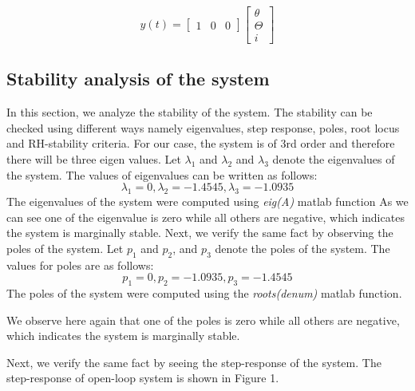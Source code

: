 \documentclass{article}
\begin{document}
\begin{equation}
y(t)=\begin{bmatrix}
1 & 0 & 0
\end{bmatrix}
\begin{bmatrix} \theta \\  \Theta \\ i \end{bmatrix}
\end{equation}



\subsection{Stability analysis of the system}
In this section, we analyze the stability of the system. The stability can be checked using different ways namely eigenvalues, step response, poles, root locus and RH-stability criteria. For our case, the system is of 3rd order and therefore there will be three eigen values. Let $\lambda_1$ and $\lambda_2$ and $\lambda_3$ denote the eigenvalues of the system. The values of eigenvalues can be written as follows:
\begin{equation} \lambda_1 = 0,   \lambda_2 = -1.4545,  \lambda_3 = -1.0935 \end{equation}
\vskip10pt
\noindent The eigenvalues of the system were computed using \textit{eig(A)} matlab function
\vskip10pt
\noindent As we can see one of the eigenvalue is zero while all others are negative, which indicates the system is marginally stable. Next, we verify the same fact by observing the poles of the system. Let $p_1$ and $p_2$, and $p_3$ denote the poles of the system. The values for poles are as follows:
\begin{equation} p_1 = 0 ,  p_2 = -1.0935 ,  p_3 =-1.4545  \end{equation}
The poles of the system were computed using the \textit{roots(denum)} matlab function. 
\vskip10pt

We observe here again that one of the poles is zero while all others are negative, which indicates the system is marginally stable. \vskip100pt

\noindent Next, we verify the same fact by seeing the step-response of the system. The step-response of open-loop system is shown in Figure 1.
\end{document}
